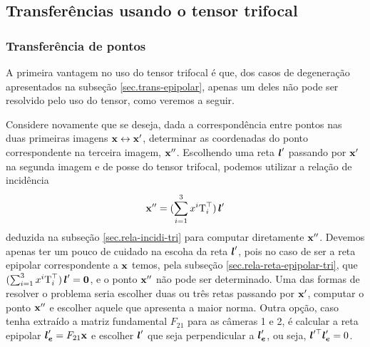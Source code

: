 \subsection{Transferências usando o tensor trifocal}

\subsubsection{Transferência de pontos}
A primeira vantagem no uso do tensor trifocal é que, dos casos de degeneração apresentados na subseção \ref{sec.trans-epipolar}, apenas um deles não pode ser resolvido pelo uso do tensor, como veremos a seguir. 

Considere novamente que se deseja, dada a correspondência entre pontos nas duas primeiras imagens $\mathbf{x}\leftrightarrow\mathbf{x}'$, determinar as coordenadas do ponto correspondente na terceira imagem, $\mathbf{x}''$. Escolhendo uma reta $\boldsymbol{l}'$ passando por $\mathbf{x}'$ na segunda imagem e de posse do tensor trifocal, podemos utilizar a relação de incidência 
\begin{equation}\label{eq.ponto-reta-ponto-isolada}
\mathbf{x}''=(\sum_{i=1}^3 x^i\mbox{T}_i^\top)\,\boldsymbol{l}'
\end{equation} 
deduzida na subseção \ref{sec.rela-incidi-tri}
para computar diretamente $\mathbf{x}''$. Devemos apenas ter um pouco de cuidado na escoha da reta $\boldsymbol{l}'$, pois no caso de ser a reta epipolar correspondente a $\mathbf{x}$ temos, pela subseção \ref{sec.rela-reta-epipolar-tri}, que $(\sum_{i=1}^3 x^i\mbox{T}_i^\top)\,\boldsymbol{l}'={\bf 0}$, e o ponto $\mathbf{x}''$ não pode ser determinado. Uma das formas de resolver o problema seria escolher duas ou três retas passando por $\mathbf{x}'$, computar o ponto $\mathbf{x}''$ e escolher aquele que apresenta a maior norma. Outra opção, caso tenha extraído a matriz fundamental $F_{21}$ para as câmeras 1 e 2, é calcular a reta epipolar $\boldsymbol{l}'_{\boldsymbol{e}}=F_{21}\mathbf{x}$ e escolher $\boldsymbol{l}'$ que seja perpendicular a $\boldsymbol{l}'_{\boldsymbol{e}}$, ou seja, $\boldsymbol{l}'^\top\boldsymbol{l}'_{\boldsymbol{e}}=0$. 


